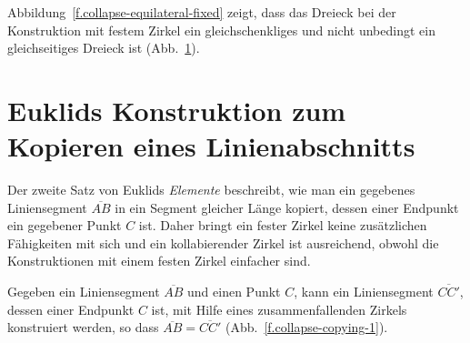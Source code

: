 Abbildung~\ref{f.collapse-equilateral-fixed} zeigt, dass das Dreieck bei der Konstruktion mit festem Zirkel ein gleichschenkliges und nicht unbedingt ein gleichseitiges Dreieck ist  (Abb.~\ref{f.collapse-equilateral-collapse}).

\section{Euklids Konstruktion zum Kopieren eines Linienabschnitts}\label{s.collapse-copy}

Der zweite Satz von Euklids \textit{Elemente} beschreibt, wie man ein gegebenes Liniensegment $\overline{AB}$ in ein Segment gleicher Länge kopiert, dessen einer Endpunkt ein gegebener Punkt $C$ ist. Daher bringt ein fester Zirkel keine zusätzlichen Fähigkeiten mit sich und ein kollabierender Zirkel ist ausreichend, obwohl die Konstruktionen mit einem festen Zirkel einfacher sind.

\begin{theorem}
Gegeben ein Liniensegment $\overline{AB}$ und einen Punkt $C$, kann ein Liniensegment $\overline{CC'}$, dessen einer Endpunkt $C$ ist, mit Hilfe eines zusammenfallenden Zirkels konstruiert werden, so dass $\overline{AB}=\overline{CC'}$ (Abb.~\ref{f.collapse-copying-1}).
\end{theorem}

\begin{figure}[t]
\subfigures
{}
\hfill
{}
\label{f.collapse-equilateral-fixed}
\label{f.collapse-equilateral-collapse}
\end{figure}


